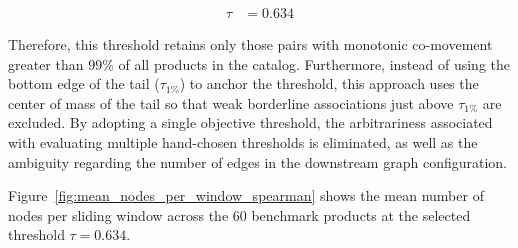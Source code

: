 \begin{align}
  \tau &= 0.634
\end{align}

Therefore, this threshold retains only those pairs with monotonic co-movement greater than $99 \%$ of all products in the catalog. Furthermore, instead of using the bottom edge of the tail ($\tau_{\text{1\%}}$) to anchor the threshold, this approach uses the center of mass of the tail so that weak borderline associations just above $\tau_{\text{1\%}}$ are excluded. By adopting a single objective threshold, the arbitrariness associated with evaluating multiple hand-chosen thresholds is eliminated, as well as the ambiguity regarding the number of edges in the downstream graph configuration.

Figure~\ref{fig:mean_nodes_per_window_spearman} shows the mean number of nodes
per sliding window across the 60 benchmark products at the selected threshold
$\tau = 0.634$.

